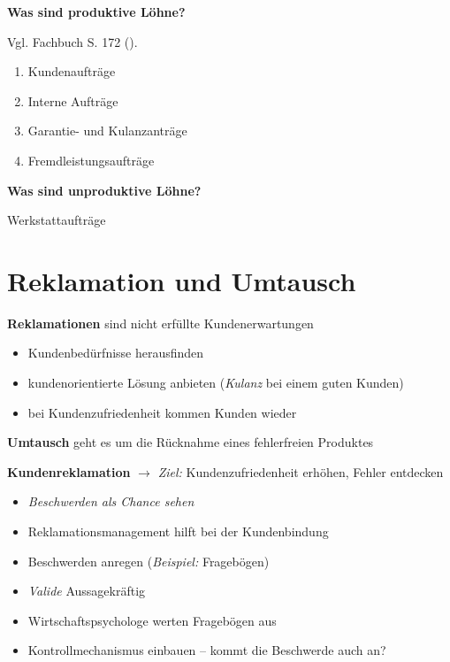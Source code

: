 \textbf{Was sind produktive Löhne?}

Vgl. Fachbuch S. 172 (\textcite{heiser:2017:betriebsfuhrung}).

\begin{enumerate}
\item
  Kundenaufträge
\item
  Interne Aufträge
\item
  Garantie- und Kulanzanträge
\item
  Fremdleistungsaufträge
\end{enumerate}

\textbf{Was sind unproduktive Löhne?}

Werkstattaufträge

\newpage

\section{Reklamation und Umtausch}\label{reklamation-und-umtausch}

\textbf{Reklamationen} sind nicht erfüllte Kundenerwartungen

\begin{itemize}
\item
  Kundenbedürfnisse herausfinden
\item
  kundenorientierte Lösung anbieten (\emph{Kulanz} bei einem guten
  Kunden)
\item
  bei Kundenzufriedenheit kommen Kunden wieder
\end{itemize}

\textbf{Umtausch} geht es um die Rücknahme eines fehlerfreien Produktes

\textbf{Kundenreklamation} $\to$ \emph{Ziel:} Kundenzufriedenheit
erhöhen, Fehler entdecken

\begin{itemize}
\item
  \emph{Beschwerden als Chance sehen}
\item
  Reklamationsmanagement hilft bei der Kundenbindung
\item
  Beschwerden anregen (\emph{Beispiel:} Fragebögen)
\item
  \emph{Valide} Aussagekräftig
\item
  Wirtschaftspsychologe werten Fragebögen aus
\item
  Kontrollmechanismus einbauen -- kommt die Beschwerde auch an?
\end{itemize}

\newpage

